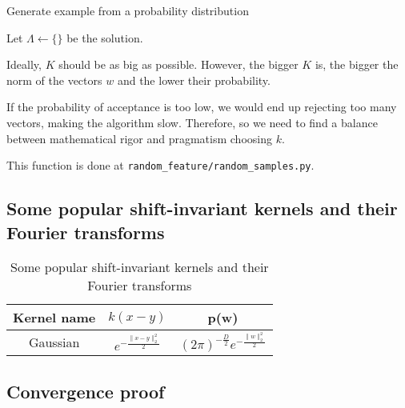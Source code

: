 \begin{algorithm}[hbt!]
    \caption{Generate example from a probability distribution }\label{alg:two}
  
        Let $\Lambda \gets \{\}$ be the solution. 
        \\
        \Return{$\Lambda$} 
    \end{algorithm}

Ideally, $K$ should be as big as  possible. 
However, the bigger $K$ is, the bigger the norm of the vectors $w$
and the lower their probability. 

If the probability of acceptance is too low, we would end up rejecting too many vectors, making the algorithm slow. Therefore, so we need to find a balance 
between mathematical rigor and pragmatism choosing $k$. 

This function is done at \texttt{random\_feature/random\_samples.py}. 


\subsection{Some popular shift-invariant kernels and their Fourier transforms}

\begin{table}[h!]
    \centering
    \begin{tabular}{|c|c|c|}
    \hline
     Kernel name & $k(x-y)$ & p(w) \\
     \hline
     Gaussian 
     & $e^{- \frac{\| x- y\|^2_2}{2}}$
    & 
    $(2 \pi)^{-\frac{D}{2}} e^{- \frac{\| w\|^2_2}{2}}$ 
    \\
    \hline
    \end{tabular}
    \caption{Some popular shift-invariant kernels and their Fourier transforms}
\end{table}




\subsection{Convergence proof}




